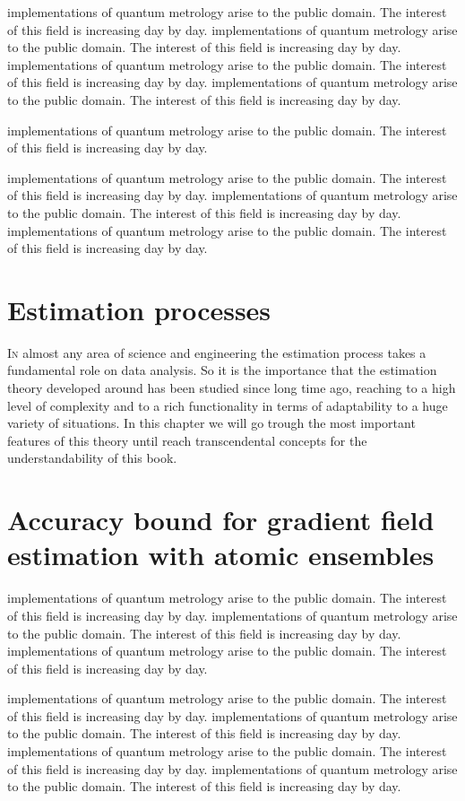 \documentclass[12pt, letterpaper, twoside]{article}
\begin{document}
implementations of quantum metrology arise to the public domain.
The interest of this field is increasing day by day.
implementations of quantum metrology arise to the public domain.
The interest of this field is increasing day by day.
implementations of quantum metrology arise to the public domain.
The interest of this field is increasing day by day.
implementations of quantum metrology arise to the public domain.
The interest of this field is increasing day by day.

implementations of quantum metrology arise to the public domain.
The interest of this field is increasing day by day.

implementations of quantum metrology arise to the public domain.
The interest of this field is increasing day by day.
implementations of quantum metrology arise to the public domain.
The interest of this field is increasing day by day.
implementations of quantum metrology arise to the public domain.
The interest of this field is increasing day by day.


\section{Estimation processes}

\lettrine[lines=2, findent=3pt,nindent=0pt]{I}{n} almost any area of science
and engineering the estimation process takes a fundamental role on 
data analysis.
So it is the importance that the estimation theory developed around has been 
studied since long time ago, reaching to a high level of complexity and 
to a rich functionality in terms of adaptability to a huge variety
of situations. 
In this chapter we will go trough the most important features of this
theory until reach transcendental concepts for the understandability of this
book. 

\section{Accuracy bound for gradient field estimation with atomic ensembles}


implementations of quantum metrology arise to the public domain.
The interest of this field is increasing day by day. 
implementations of quantum metrology arise to the public domain.
The interest of this field is increasing day by day.
implementations of quantum metrology arise to the public domain.
The interest of this field is increasing day by day.

implementations of quantum metrology arise to the public domain.
The interest of this field is increasing day by day.
implementations of quantum metrology arise to the public domain.
The interest of this field is increasing day by day.
implementations of quantum metrology arise to the public domain.
The interest of this field is increasing day by day.
implementations of quantum metrology arise to the public domain.
The interest of this field is increasing day by day.
\end{document}
